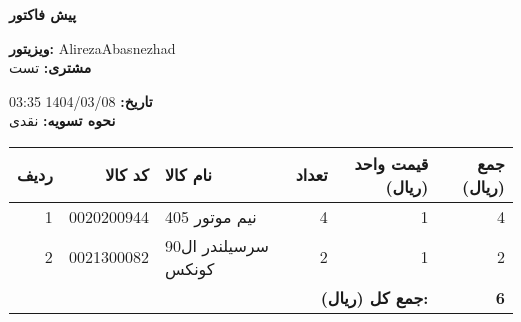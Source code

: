 \documentclass[a4paper,12pt]{article}
\begin{document}
        \begin{center}
            \textbf{\Large پیش فاکتور}
        \end{center}
        \vspace{0.5cm}
        \noindent
        \begin{flushleft}
            \textbf{ویزیتور:} AlirezaAbasnezhad \\
            \textbf{مشتری:} تست \\
        \end{flushleft}
        \begin{flushright}
            \textbf{تاریخ:} 1404/03/08 03:35 \\
            \textbf{نحوه تسویه:} نقدی
        \end{flushright}
        \vspace{0.5cm}
        \begin{longtable}{|r|r|p{5cm}|r|r|r|}
            \hline
            \rowcolor{headerblue} \color{white} %
            \textbf{ردیف} & \textbf{کد کالا} & \textbf{نام کالا} & \textbf{تعداد} & \textbf{قیمت واحد (ریال)} & \textbf{جمع (ریال)} \\
            \hline
            \endhead
                    1 & 0020200944 & نيم موتور 405 & 4 & 1 & 4 \\
            \hline
            2 & 0021300082 & سرسيلندر ال90 کونکس & 2 & 1 & 2 \\
            \hline

            \hline
            
            \multicolumn{5}{|r|}{\textbf{جمع کل (ریال):}} & \textbf{ 6 } \\
            \hline
        \end{longtable}
        
\end{document}
